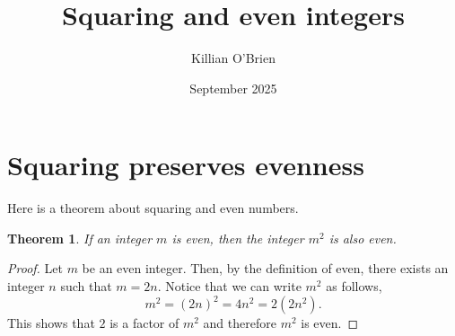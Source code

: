 \documentclass{article}
\title{Squaring and even integers}
\author{Killian O'Brien}
\date{September 2025}
\newtheorem{theorem}{Theorem}
\begin{document}
\maketitle

\section{Squaring preserves evenness}

Here is a theorem about squaring and even numbers. 

\begin{theorem}
    If an integer $m$ is even, then the integer $m^2$ is also even.
\end{theorem}
\begin{proof}
Let $m$ be an even integer. Then, by the definition of even, there exists an integer $n$ such that $m=2n$. Notice that we can write $m^2$ as follows,
$$m^2 = (2n)^2 = 4n^2 = 2(2n^2).$$
This shows that $2$ is a factor of $m^2$ and therefore $m^2$ is even.
\end{proof}
\end{document}
